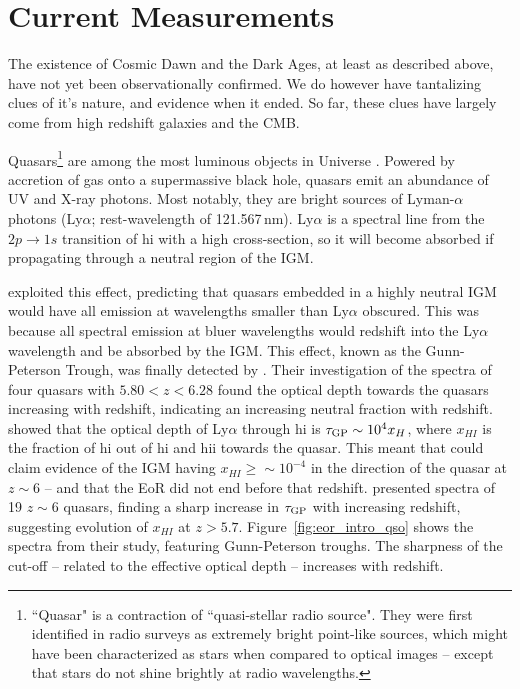 \section{Current Measurements}
\label{sec:eor_intro_current}

The existence of Cosmic Dawn and the Dark Ages, at least as described above, have not yet been observationally confirmed. We do however have tantalizing clues of it's nature, and evidence when it ended. So far, these clues have largely come from high redshift galaxies and the CMB.

Quasars\footnote{``Quasar" is a contraction of ``quasi-stellar radio source". They were first identified in radio surveys as extremely bright point-like sources, which might have been characterized as stars when compared to optical images -- except that stars do not shine brightly at radio wavelengths.} are among the most luminous objects in Universe \citep[e.g.][]{Manti.17}. Powered by accretion of gas onto a supermassive black hole, quasars emit an abundance of UV and X-ray photons. Most notably, they are bright sources of Lyman-$\alpha$ photons (Ly$\alpha$; rest-wavelength of 121.567\,nm). Ly$\alpha$ is a spectral line from the $2p \rightarrow 1s$ transition of {\sc hi} with a high cross-section, so it will become absorbed if propagating through a neutral region of the IGM. 

\cite{Gunn.65} exploited this effect, predicting that quasars embedded in a highly neutral IGM would have all emission at wavelengths smaller than Ly$\alpha$ obscured. This was because all spectral emission at bluer wavelengths would redshift into the Ly$\alpha$ wavelength and be absorbed by the IGM. This effect, known as the Gunn-Peterson Trough, was finally detected by \cite{Becker.01}. Their investigation of the spectra of four quasars with $5.80<z<6.28$ found the optical depth towards the quasars increasing with redshift, indicating an increasing neutral fraction with redshift. \cite{Gunn.65} showed that the optical depth of Ly$\alpha$ through {\sc hi} is $\tau_{\rm GP}\sim10^4x_H$, where $x_{HI}$ is the fraction of {\sc hi} out of {\sc hi} and {\sc hii} towards the quasar. This meant that \cite{Becker.01} could claim evidence of the IGM having $x_{HI}\geqslant\sim10^{-4}$ in the direction of the quasar at $z\sim6$ -- and that the EoR did not end before that redshift. \cite{Fan.06.2} presented spectra of 19 $z\sim 6$ quasars, finding a sharp increase in $\tau_{\rm GP}$ with increasing redshift, suggesting evolution of $x_{HI}$ at $z>5.7$. Figure~\ref{fig:eor_intro_qso} shows the spectra from their study, featuring Gunn-Peterson troughs. The sharpness of the cut-off -- related to the effective optical depth -- increases with redshift.

